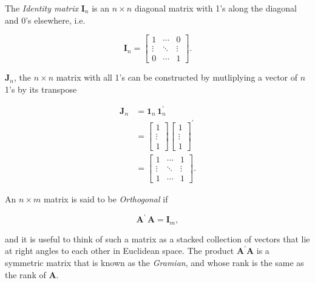 \documentclass[graybox,envcountchap,sectrefs]{svmono}\usepackage[]{graphicx}\usepackage[]{xcolor}
\begin{document}
\begin{appendices}
The \emph{Identity matrix} $\mathrm{\mathbf{I}}_{n}$ is an $n\times n$
diagonal matrix with 1's along the diagonal and 0's elsewhere, i.e.

\begin{equation}
\mathrm{\mathbf{I}}_{n}=\left[\begin{array}{ccc}
1 & \cdots & 0\\
\vdots & \ddots & \vdots\\
0 & \cdots & 1
\end{array}\right].\label{eq:IdentityMatrix}
\end{equation}

$\mathrm{\mathbf{J}}_{n}$, the $n\times n$ matrix with all 1's can
be constructed by mutliplying a vector of $n$ 1's by its transpose

\begin{align}
\mathrm{\mathbf{J}}_{n} & =\mathrm{\mathbf{1}}_{n}\,\mathrm{\mathbf{1}}_{n}^{\prime}\nonumber \\
 & =\left[\begin{array}{c}
1\\
\vdots\\
1
\end{array}\right]\left[\begin{array}{c}
1\\
\vdots\\
1
\end{array}\right]^{\prime}\nonumber \\
 & =\left[\begin{array}{ccc}
1 & \cdots & 1\\
\vdots & \ddots & \vdots\\
1 & \cdots & 1
\end{array}\right].\label{eq:AllOneMatrix}
\end{align}

An $n\times m$ matrix is said to be \emph{Orthogonal} if

\begin{equation}
\mathrm{\mathbf{A}}^{\prime}\,\mathrm{\mathbf{A}}=\mathrm{\mathbf{I}}_{m},\label{eq:OrthogonalMatrix}
\end{equation}

and it is useful to think of such a matrix as a stacked collection
of vectors that lie at right angles to each other in Euclidean space.
The product $\mathrm{\mathbf{A}}^{\prime}\mathrm{\mathbf{A}}$ is
a symmetric matrix that is known as the \emph{Gramian}, and whose
rank is the same as the rank of $\mathrm{\mathbf{A}}$.


\end{appendices}
\end{document}
